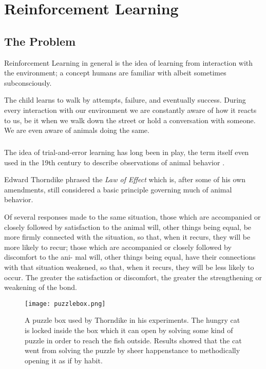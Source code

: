 \chapter{Reinforcement Learning}
\section{The Problem}
Reinforcement Learning in general is
the idea of learning from interaction with the environment;
a concept humans are familiar with albeit sometimes subconsciously.

The child learns to walk by attempts, failure,
and eventually success.
During every interaction with our environment
we are constantly aware of how it reacts to us,
be it when we walk down the street
or hold a conversation with someone.
We are even aware of animals doing the same.

\paragraph{}
The idea of trial-and-error learning has long been in play,
the term itself even used in the 19th century
to describe observations of animal behavior
\parencite{woodworth1938experimental}.

Edward Thorndike phrased the
\textit{Law of Effect}
which is,
after some of his own amendments,
still considered a basic principle
governing much of animal behavior.

\begin{displayquote}
Of several responses made to 
the same situation, those which are accompanied or closely 
followed by satisfaction to the animal will, other things being 
equal, be more firmly connected with the situation, so that, 
when it recurs, they will be more likely to recur; those which 
are accompanied or closely followed by discomfort to the ani- 
mal will, other things being equal, have their connections with 
that situation weakened, so that, when it recurs, they will be 
less likely to occur. The greater the satisfaction or discomfort, 
the greater the strengthening or weakening of the bond. 

\end{displayquote}

\begin{figure}[h]
  \centering
  \texttt{[image: puzzlebox.png]}
  \caption{
    A puzzle box used by Thorndike in his experiments.
    The hungry cat is locked inside the box which it can open
    by solving some kind of puzzle
    in order to reach the fish outside.
    Results showed that the cat went from solving the puzzle by sheer happenstance
    to methodically opening it as if by habit.
  }
  \label{fig:puzzlebox}
\end{figure}

